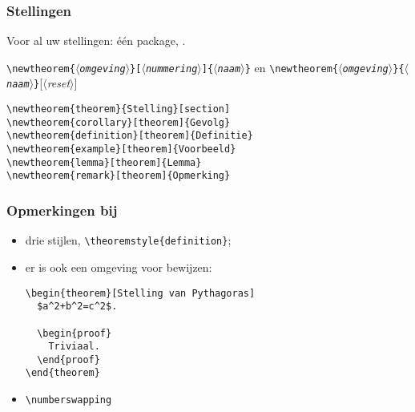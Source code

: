 \begin{frame}[fragile]
  \frametitle{Stellingen}

  Voor al uw stellingen: \'e\'en package, .

  \texttt{\textbackslash newtheorem\{$\langle$\textsl{omgeving}$\rangle$\}[$\langle$\textsl{nummering}$\rangle$]\{$\langle$\textsl{naam}$\rangle$\}} en \texttt{\textbackslash newtheorem\{$\langle$\textsl{omgeving}$\rangle$\}\{$\langle$\textsl{naam}$\rangle$\}}[$\langle$\textsl{reset}$\rangle$]

  \begin{verbatim}
\newtheorem{theorem}{Stelling}[section]
\newtheorem{corollary}[theorem]{Gevolg}
\newtheorem{definition}[theorem]{Definitie}
\newtheorem{example}[theorem]{Voorbeeld}
\newtheorem{lemma}[theorem]{Lemma}
\newtheorem{remark}[theorem]{Opmerking}
  \end{verbatim}
\end{frame}

\begin{frame}[fragile]
  \frametitle{Opmerkingen bij }

  \begin{itemize}
    \item drie stijlen, \verb|\theoremstyle{definition}|;
    \item er is ook een omgeving voor bewijzen:
      {\footnotesize
      \begin{verbatim}
\begin{theorem}[Stelling van Pythagoras]
  $a^2+b^2=c^2$.

  \begin{proof}
    Triviaal.  
  \end{proof}
\end{theorem}
      \end{verbatim}
      }
    \item \verb|\numberswapping|
  \end{itemize}
\end{frame}
  
